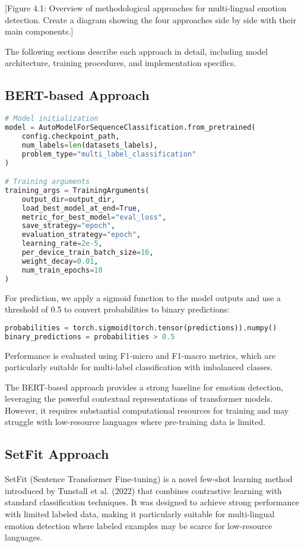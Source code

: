 \documentclass[a4paper,12pt]{extarticle}
\begin{document}
[Figure 4.1: Overview of methodological approaches for multi-lingual emotion detection. Create a diagram showing the four approaches side by side with their main components.]

The following sections describe each approach in detail, including model architecture, training procedures, and implementation specifics.

\subsection{BERT-based Approach}

\begin{lstlisting}[language=Python]
# Model initialization
model = AutoModelForSequenceClassification.from_pretrained(
    config.checkpoint_path, 
    num_labels=len(datasets_labels),
    problem_type="multi_label_classification"
)

# Training arguments
training_args = TrainingArguments(
    output_dir=output_dir,
    load_best_model_at_end=True,
    metric_for_best_model="eval_loss",
    save_strategy="epoch",
    evaluation_strategy="epoch",
    learning_rate=2e-5,
    per_device_train_batch_size=16,
    weight_decay=0.01,
    num_train_epochs=10
)
\end{lstlisting}

For prediction, we apply a sigmoid function to the model outputs and use a threshold of 0.5 to convert probabilities to binary predictions:

\begin{lstlisting}[language=Python]
probabilities = torch.sigmoid(torch.tensor(predictions)).numpy()
binary_predictions = probabilities > 0.5
\end{lstlisting}

Performance is evaluated using F1-micro and F1-macro metrics, which are particularly suitable for multi-label classification with imbalanced classes.

The BERT-based approach provides a strong baseline for emotion detection, leveraging the powerful contextual representations of transformer models. However, it requires substantial computational resources for training and may struggle with low-resource languages where pre-training data is limited.

\subsection{SetFit Approach}

SetFit (Sentence Transformer Fine-tuning) is a novel few-shot learning method introduced by Tunstall et al. (2022) that combines contrastive learning with standard classification techniques. It was designed to achieve strong performance with limited labeled data, making it particularly suitable for multi-lingual emotion detection where labeled examples may be scarce for low-resource languages.
\end{document}
